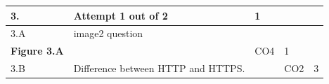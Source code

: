 \documentclass[12pt]{article}
\begin{document}
\begin{tabular}{|L{1cm}|L{8cm}|C{1cm}|C{1cm}|C{1cm}|}\hline
	\bf3. & \bf{Attempt} \bf{1} \bf{out of} \bf{2} & \bf{1}  & & \\ \hline





		3.A &
	image2 question \newline
			\begin{center}
		\includegraphics[width=4cm,height=3cm]{media/diagrams/image2.jpg}\\\bf{Figure }\bf3.A		
	\end{center}
		
	 &   & CO4 & 1\\ \hline
		3.B &
	Difference between HTTP and HTTPS. \newline
			
	 &   & CO2 & 3\\ \hline
	\end{tabular}
\end{document}
